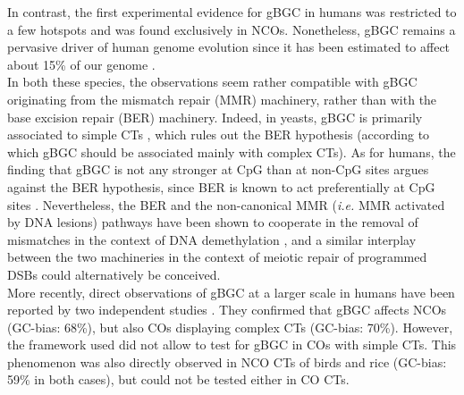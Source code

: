 In contrast, the first experimental evidence for gBGC in humans was restricted to a few hotspots \citep{odenthal-hesse2014transmission,arbeithuber2015crossovers} and was found exclusively in NCOs.
Nonetheless, gBGC remains a pervasive driver of human genome evolution since it has been estimated to affect about 15\% of our genome \citep{pouyet2018background}.\\

In both these species, the observations seem rather compatible with gBGC originating from the mismatch repair (MMR) machinery, rather than with the base excision repair (BER) machinery.
Indeed, in yeasts, gBGC is primarily associated to simple CTs \citep{lesecque2013gcbiased}, which rules out the BER hypothesis (according to which gBGC should be associated mainly with complex CTs).
As for humans, the finding that gBGC is not any stronger at CpG than at non-CpG sites argues against the BER hypothesis, since BER is known to act preferentially at CpG sites \citep{glemin2015quantification}.
Nevertheless, the BER and the non-canonical MMR (\textit{i.e.} MMR activated by DNA lesions) pathways have been shown to cooperate in the removal of mismatches in the context of DNA demethylation \citep{grin2016interplay}, and a similar interplay between the two machineries in the context of meiotic repair of programmed DSBs could alternatively be conceived.\\


More recently, direct observations of gBGC at a larger scale in humans have been reported by two independent studies \citep{williams2015noncrossover, halldorsson2016rate}.
They confirmed that gBGC affects NCOs (GC-bias: 68\%), but also COs displaying complex CTs (GC-bias: 70\%).
However, the framework used did not allow to test for gBGC in COs with simple CTs.
This phenomenon was also directly observed in NCO CTs of birds \citep{smeds2016highresolution} and rice \citep{si2015widely} (GC-bias: 59\% in both cases), but could not be tested either in CO CTs.









